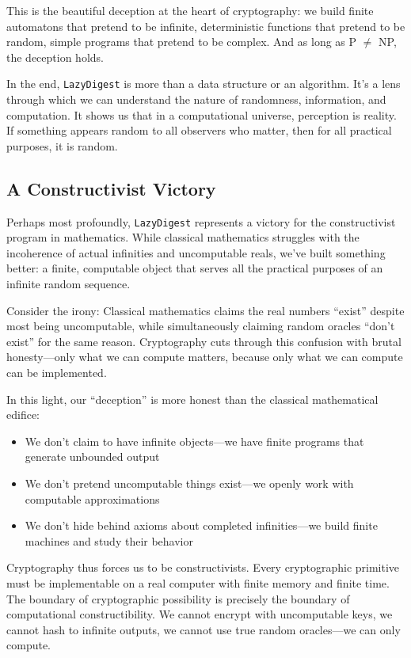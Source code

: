 \documentclass[11pt]{article}
\begin{document}
This is the beautiful deception at the heart of cryptography: we build finite automatons that pretend to be infinite, deterministic functions that pretend to be random, simple programs that pretend to be complex. And as long as P $\neq$ NP, the deception holds.

In the end, \texttt{LazyDigest} is more than a data structure or an algorithm. It's a lens through which we can understand the nature of randomness, information, and computation. It shows us that in a computational universe, perception is reality. If something appears random to all observers who matter, then for all practical purposes, it is random.

\subsection{A Constructivist Victory}

Perhaps most profoundly, \texttt{LazyDigest} represents a victory for the constructivist program in mathematics. While classical mathematics struggles with the incoherence of actual infinities and uncomputable reals, we've built something better: a finite, computable object that serves all the practical purposes of an infinite random sequence.

Consider the irony: Classical mathematics claims the real numbers ``exist'' despite most being uncomputable, while simultaneously claiming random oracles ``don't exist'' for the same reason. Cryptography cuts through this confusion with brutal honesty---only what we can compute matters, because only what we can compute can be implemented.

In this light, our ``deception'' is more honest than the classical mathematical edifice:
\begin{itemize}
\item We don't claim to have infinite objects---we have finite programs that generate unbounded output
\item We don't pretend uncomputable things exist---we openly work with computable approximations
\item We don't hide behind axioms about completed infinities---we build finite machines and study their behavior
\end{itemize}

Cryptography thus forces us to be constructivists. Every cryptographic primitive must be implementable on a real computer with finite memory and finite time. The boundary of cryptographic possibility is precisely the boundary of computational constructibility. We cannot encrypt with uncomputable keys, we cannot hash to infinite outputs, we cannot use true random oracles---we can only compute.
\end{document}
